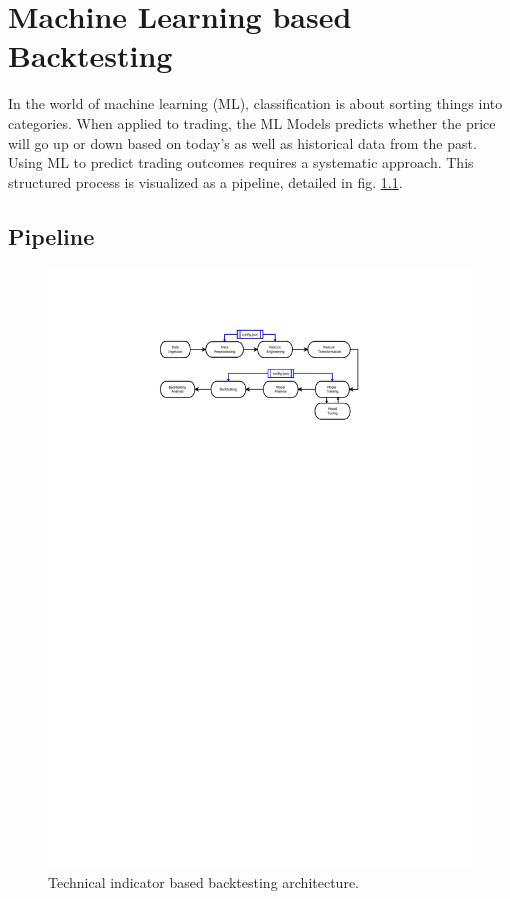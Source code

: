 \chapter{Machine Learning based Backtesting}

In the world of machine learning (ML), classification is about sorting things into categories. When applied to trading,
the ML Models predicts whether the price will go up or down based on today's as well as historical data from the past.
Using ML to predict trading outcomes requires a systematic approach.
This structured process is visualized as a pipeline, detailed in fig. \ref{fig:ml_pipeline}.

\section{Pipeline}

\begin{figure}[H]
\centering
\includegraphics[trim=25mm 220mm 55mm 30mm, width=1.2\textwidth, clip]{./pdf/ml_pipeline.pdf}
\caption{Technical indicator based backtesting architecture.}
\label{fig:ml_pipeline}
\end{figure}

